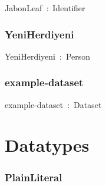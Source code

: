 \documentclass{article}
\begin{document}
JabonLeaf~:~Identifier

\subsubsection*{YeniHerdiyeni}

YeniHerdiyeni~:~Person

\subsubsection*{example-dataset}

example-dataset~:~Dataset

\section*{Datatypes}\subsubsection*{PlainLiteral}
\end{document}
